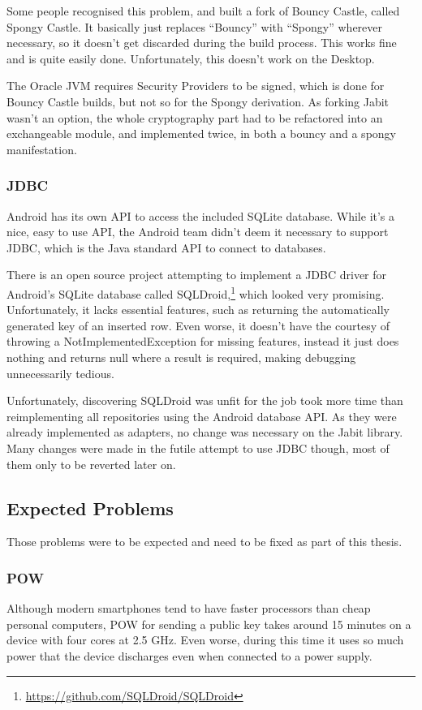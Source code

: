 \documentclass{bfh}
\begin{document}
  Some people recognised this problem, and built a fork of Bouncy Castle, called Spongy Castle. It basically just replaces “Bouncy” with “Spongy” wherever necessary, so it doesn’t get discarded during the build process. This works fine and is quite easily done. Unfortunately, this doesn’t work on the Desktop.

  The Oracle JVM requires Security Providers to be signed, which is done for Bouncy Castle builds, but not so for the Spongy derivation. As forking Jabit wasn’t an option, the whole cryptography part had to be refactored into an exchangeable module, and implemented twice, in both a bouncy and a spongy manifestation.

  \subsubsection{JDBC}
  \label{subsec:jdbc}
  Android has its own API to access the included SQLite database. While it’s a nice, easy to use \ac{API}, the Android team didn’t deem it necessary to support \ac{JDBC}, which is the Java standard API to connect to databases.

  There is an open source project attempting to implement a \ac{JDBC} driver for Android’s SQLite database called SQLDroid,\footnote{\url{https://github.com/SQLDroid/SQLDroid}} which looked very promising. Unfortunately, it lacks essential features, such as returning the automatically generated key of an inserted row. Even worse, it doesn't have the courtesy of throwing a NotImplementedException for missing features, instead it just does nothing and returns null where a result is required, making debugging unnecessarily tedious.

  Unfortunately, discovering SQLDroid was unfit for the job took more time than reimplementing all repositories using the Android database API. As they were already implemented as adapters, no change was necessary on the Jabit library. Many changes were made in the futile attempt to use JDBC though, most of them only to be reverted later on.

  \subsection{Expected Problems}
  Those problems were to be expected and need to be fixed as part of this thesis.

  \subsubsection{\acl{POW}}
  Although modern smartphones tend to have faster processors than cheap personal computers, \ac{POW} for sending a public key takes around 15 minutes on a device with four cores at 2.5 GHz. Even worse, during this time it uses so much power that the device discharges even when connected to a power supply.
\end{document}
